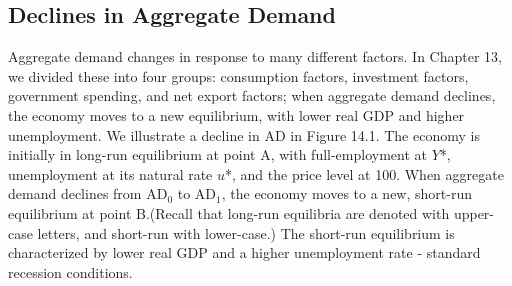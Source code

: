 \documentclass[11pt]{article} %
\begin{document}
\subsection*{Declines in Aggregate Demand}
Aggregate demand changes in response to many different factors. In Chapter 13, we divided these into four groups: consumption factors, investment factors, government spending, and net export factors; when aggregate demand declines, the economy moves to a new equilibrium, with lower real GDP and higher unemployment. We illustrate a decline in AD in Figure 14.1. The economy is initially in long-run equilibrium at point A, with full-employment at \(Y\)*, unemployment at its natural rate \(u\)*, and the price level at 100. When aggregate demand declines from \(\text{AD}_0\) to \(\text{AD}_1\), the economy moves to a new, short-run equilibrium at point B.(Recall that long-run equilibria are denoted with upper-case letters, and short-run with lower-case.) The short-run equilibrium is characterized by lower real GDP and a higher unemployment rate - standard recession conditions.
\end{document}
